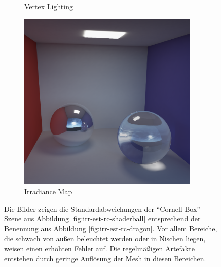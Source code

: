 \begin{figure}[h]
\begin{subfigure}[b]{0.33\textwidth}
			\caption{Vertex Lighting}
		\end{subfigure}
		\begin{subfigure}[b]{0.33\textwidth}
			\center
			\includegraphics[width=0.95\textwidth]{pic/irrmap-cornell-irrmap.png}
			\caption{Irradiance Map}
		\end{subfigure}
		\caption[Irradiance-Map anhand der \enquote{Cornell Box}-Szene]{Die Bilder zeigen die Standardabweichungen der \enquote{Cornell Box}-Szene aus Abbildung \ref{fig:irr-est-rc-shaderball} entsprechend der Benennung aus Abbildung \ref{fig:irr-est-rc-dragon}. Vor allem Bereiche, die schwach von außen beleuchtet werden oder in Nischen liegen, weisen einen erhöhten Fehler auf. Die regelmäßigen Artefakte entstehen durch geringe Auflösung der Mesh in diesen Bereichen.}
		\label{fig:irr-map-cornell}
	\end{figure}

